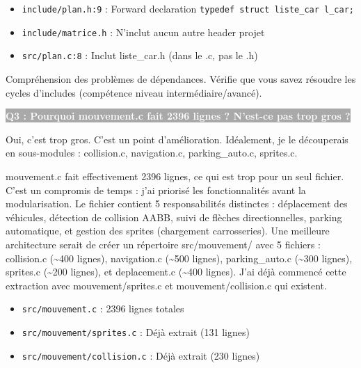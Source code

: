 \documentclass[12pt,a4paper]{article}
\newcommand{\question}[1]{%
    \vspace{0.5cm}
    \noindent\colorbox{darkgray}{\textcolor{white}{\textbf{#1}}}
    \vspace{0.3cm}
}
\begin{document}
\begin{reference_code}
\begin{itemize}
    \item \texttt{include/plan.h:9} : Forward declaration \texttt{typedef struct liste\_car l\_car;}
    \item \texttt{include/matrice.h} : N'inclut aucun autre header projet
    \item \texttt{src/plan.c:8} : Inclut liste\_car.h (dans le .c, pas le .h)
\end{itemize}
\end{reference_code}

\begin{objectif_prof}
Compréhension des problèmes de dépendances. Vérifie que vous savez résoudre les cycles d'includes (compétence niveau intermédiaire/avancé).
\end{objectif_prof}

\question{Q3 : Pourquoi mouvement.c fait 2396 lignes ? N'est-ce pas trop gros ?}

\begin{reponse_courte}
Oui, c'est trop gros. C'est un point d'amélioration. Idéalement, je le découperais en sous-modules : collision.c, navigation.c, parking\_auto.c, sprites.c.
\end{reponse_courte}

\begin{reponse_longue}
mouvement.c fait effectivement 2396 lignes, ce qui est trop pour un seul fichier. C'est un compromis de temps : j'ai priorisé les fonctionnalités avant la modularisation. Le fichier contient 5 responsabilités distinctes : déplacement des véhicules, détection de collision AABB, suivi de flèches directionnelles, parking automatique, et gestion des sprites (chargement carrosseries). Une meilleure architecture serait de créer un répertoire src/mouvement/ avec 5 fichiers : collision.c (\textasciitilde{}400 lignes), navigation.c (\textasciitilde{}500 lignes), parking\_auto.c (\textasciitilde{}300 lignes), sprites.c (\textasciitilde{}200 lignes), et deplacement.c (\textasciitilde{}400 lignes). J'ai déjà commencé cette extraction avec mouvement/sprites.c et mouvement/collision.c qui existent.
\end{reponse_longue}

\begin{reference_code}
\begin{itemize}
    \item \texttt{src/mouvement.c} : 2396 lignes totales
    \item \texttt{src/mouvement/sprites.c} : Déjà extrait (131 lignes)
    \item \texttt{src/mouvement/collision.c} : Déjà extrait (230 lignes)
\end{itemize}
\end{reference_code}
\end{document}
